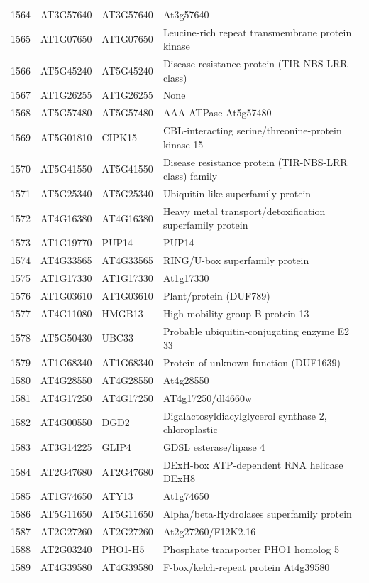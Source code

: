\documentclass[11pt]{article}
\begin{document}
\begin{center}
\begin{tabular}{rlll}
1564 & AT3G57640 & AT3G57640 & At3g57640\\
1565 & AT1G07650 & AT1G07650 & Leucine-rich repeat transmembrane protein kinase\\
1566 & AT5G45240 & AT5G45240 & Disease resistance protein (TIR-NBS-LRR class)\\
1567 & AT1G26255 & AT1G26255 & None\\
1568 & AT5G57480 & AT5G57480 & AAA-ATPase At5g57480\\
1569 & AT5G01810 & CIPK15 & CBL-interacting serine/threonine-protein kinase 15\\
1570 & AT5G41550 & AT5G41550 & Disease resistance protein (TIR-NBS-LRR class) family\\
1571 & AT5G25340 & AT5G25340 & Ubiquitin-like superfamily protein\\
1572 & AT4G16380 & AT4G16380 & Heavy metal transport/detoxification superfamily protein\\
1573 & AT1G19770 & PUP14 & PUP14\\
1574 & AT4G33565 & AT4G33565 & RING/U-box superfamily protein\\
1575 & AT1G17330 & AT1G17330 & At1g17330\\
1576 & AT1G03610 & AT1G03610 & Plant/protein (DUF789)\\
1577 & AT4G11080 & HMGB13 & High mobility group B protein 13\\
1578 & AT5G50430 & UBC33 & Probable ubiquitin-conjugating enzyme E2 33\\
1579 & AT1G68340 & AT1G68340 & Protein of unknown function (DUF1639)\\
1580 & AT4G28550 & AT4G28550 & At4g28550\\
1581 & AT4G17250 & AT4G17250 & AT4g17250/dl4660w\\
1582 & AT4G00550 & DGD2 & Digalactosyldiacylglycerol synthase 2, chloroplastic\\
1583 & AT3G14225 & GLIP4 & GDSL esterase/lipase 4\\
1584 & AT2G47680 & AT2G47680 & DExH-box ATP-dependent RNA helicase DExH8\\
1585 & AT1G74650 & ATY13 & At1g74650\\
1586 & AT5G11650 & AT5G11650 & Alpha/beta-Hydrolases superfamily protein\\
1587 & AT2G27260 & AT2G27260 & At2g27260/F12K2.16\\
1588 & AT2G03240 & PHO1-H5 & Phosphate transporter PHO1 homolog 5\\
1589 & AT4G39580 & AT4G39580 & F-box/kelch-repeat protein At4g39580\\

\end{tabular}
\end{center}
\end{document}

